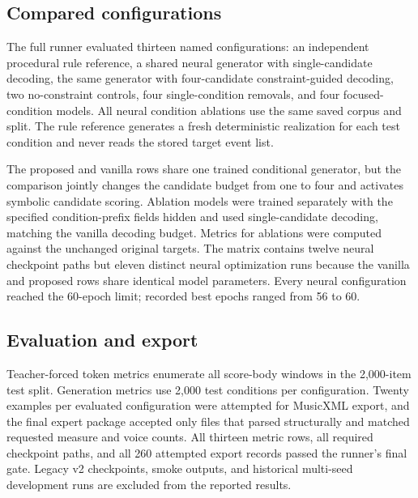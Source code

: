\subsection{Compared configurations}

The full runner evaluated thirteen named configurations: an independent procedural rule reference, a shared neural generator with single-candidate decoding, the same generator with four-candidate constraint-guided decoding, two no-constraint controls, four single-condition removals, and four focused-condition models. All neural condition ablations use the same saved corpus and split. The rule reference generates a fresh deterministic realization for each test condition and never reads the stored target event list.

The proposed and vanilla rows share one trained conditional generator, but the comparison jointly changes the candidate budget from one to four and activates symbolic candidate scoring. Ablation models were trained separately with the specified condition-prefix fields hidden and used single-candidate decoding, matching the vanilla decoding budget. Metrics for ablations were computed against the unchanged original targets. The matrix contains twelve neural checkpoint paths but eleven distinct neural optimization runs because the vanilla and proposed rows share identical model parameters. Every neural configuration reached the 60-epoch limit; recorded best epochs ranged from 56 to 60.

\subsection{Evaluation and export}

Teacher-forced token metrics enumerate all score-body windows in the 2,000-item test split. Generation metrics use 2,000 test conditions per configuration. Twenty examples per evaluated configuration were attempted for MusicXML export, and the final expert package accepted only files that parsed structurally and matched requested measure and voice counts. All thirteen metric rows, all required checkpoint paths, and all 260 attempted export records passed the runner's final gate. Legacy v2 checkpoints, smoke outputs, and historical multi-seed development runs are excluded from the reported results.
